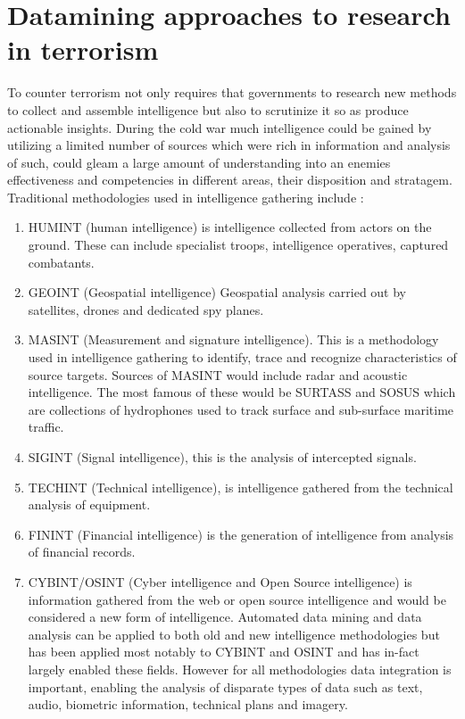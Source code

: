 \chapter[Datamining and statistical approaches to research in terrorism and counter terrorism]{Datamining approaches to research in terrorism}

To counter terrorism not only requires that governments to research new methods to collect and assemble intelligence but also to scrutinize it so as produce actionable insights. During the cold war much intelligence could be gained by utilizing a limited number of sources which were rich in information and analysis of such, could gleam a large amount of understanding into an enemies effectiveness and competencies in different areas, their disposition and stratagem. Traditional methodologies used in intelligence gathering include \citep{tanner2014examining}:
\begin{enumerate}
\item HUMINT (human intelligence) is intelligence collected from actors on the ground. These can include specialist troops, intelligence operatives, captured combatants.
\item GEOINT (Geospatial intelligence) Geospatial analysis carried out by satellites, drones and dedicated spy planes.
\item MASINT (Measurement and signature intelligence). This is a methodology  used in intelligence gathering to identify, trace and recognize characteristics of source targets. Sources of MASINT would include radar and acoustic intelligence. The most famous of these would be SURTASS and SOSUS \citep{noles2003judge} which are collections of hydrophones used to track surface and sub-surface maritime traffic.
\item SIGINT (Signal intelligence), this is the analysis of intercepted signals.
\item TECHINT (Technical intelligence), is intelligence gathered from the technical analysis of equipment.
\item FININT  (Financial intelligence) is the generation of intelligence from analysis of financial records.
\item CYBINT/OSINT (Cyber intelligence and Open Source intelligence) \citep{csahinnew} is information gathered from the web or open source intelligence and would be considered a new form of intelligence. Automated data mining and data analysis can be applied to both old and new  intelligence methodologies but has been applied most notably to CYBINT and OSINT and has in-fact largely enabled these fields.
However for all methodologies data integration is important, enabling the analysis of disparate types of data such as text, audio, biometric information, technical plans and imagery.
\end{enumerate}


